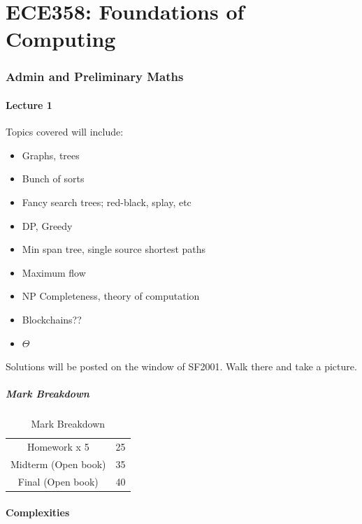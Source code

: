 \documentclass[../notes.tex]{subfiles}
\begin{document}
\part{ECE358: Foundations of Computing}


\section{Admin and Preliminary Maths}

\subsection{Lecture 1}

Topics covered will include:
\begin{itemize}
	\item Graphs, trees
	\item Bunch of sorts
	\item Fancy search trees; red-black, splay, etc
	\item DP, Greedy
	\item Min span tree, single source shortest paths
	\item Maximum flow
	\item NP Completeness, theory of computation
	\item Blockchains??
	\item $ \Theta $ 
\end{itemize}

Solutions will be posted on the window of SF2001. Walk there and take a picture.

\subsubsection{Mark Breakdown}

\begin{table}[H]
	\centering
	\caption{Mark Breakdown}
	\begin{tabular}{|c|c|}
		\hline
		Homework x 5 & 25 \\
		Midterm (Open book) & 35 \\
		Final (Open book) & 40\\
		\hline
	\end{tabular}
\end{table}




\subsection{Complexities}
\end{document}
